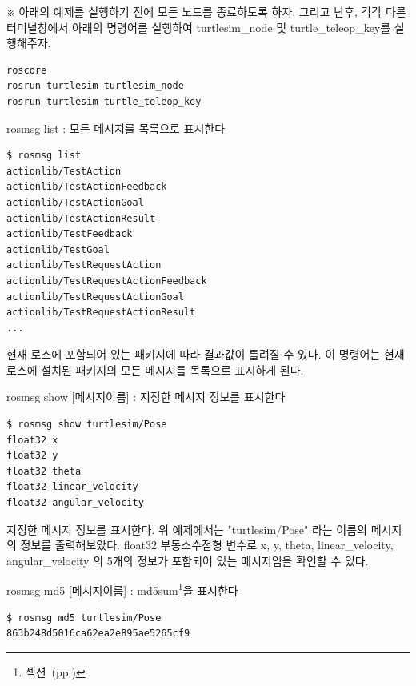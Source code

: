 \vspace{\baselineskip}
\noindent
※ 아래의 예제를 실행하기 전에 모든 노드를 종료하도록 하자. 그리고 난후, 각각 다른 터미널창에서 아래의 명령어를 실행하여 turtlesim\_node 및 turtle\_teleop\_key를 실행해주자.

\begin{lstlisting}[language=ROS]
roscore
rosrun turtlesim turtlesim_node 
rosrun turtlesim turtle_teleop_key
\end{lstlisting}

\setcounter{num}{0}

\vspace{\baselineskip}
\noindent
{}\circled{\thenum} rosmsg list : 모든 메시지를 목록으로 표시한다

\begin{lstlisting}[language=ROS]
$ rosmsg list
actionlib/TestAction
actionlib/TestActionFeedback
actionlib/TestActionGoal
actionlib/TestActionResult
actionlib/TestFeedback
actionlib/TestGoal
actionlib/TestRequestAction
actionlib/TestRequestActionFeedback
actionlib/TestRequestActionGoal
actionlib/TestRequestActionResult
...
\end{lstlisting}

\noindent
현재 로스에 포함되어 있는 패키지에 따라 결과값이 틀려질 수 있다. 이 명령어는 현재 로스에 설치된 패키지의 모든 메시지를 목록으로 표시하게 된다.

\vspace{\baselineskip}
\noindent
{}\circled{\thenum} rosmsg show [메시지이름] : 지정한 메시지 정보를 표시한다

\begin{lstlisting}[language=ROS]
$ rosmsg show turtlesim/Pose 
float32 x
float32 y
float32 theta
float32 linear_velocity
float32 angular_velocity
\end{lstlisting}

\noindent
지정한 메시지 정보를 표시한다. 위 예제에서는 "turtlesim/Pose" 라는 이름의 메시지의 정보를 출력해보았다. float32 부동소수점형 변수로 x, y, theta, linear\_velocity, angular\_velocity 의 5개의 정보가 포함되어 있는 메시지임을 확인할 수 있다.

\vspace{\baselineskip}
\noindent
{}\circled{\thenum} rosmsg md5 [메시지이름] : md5sum\footnote{섹션~(pp.\pageref{def:RosMD5})}을 표시한다

\begin{lstlisting}[language=ROS]
$ rosmsg md5 turtlesim/Pose 
863b248d5016ca62ea2e895ae5265cf9
\end{lstlisting}

